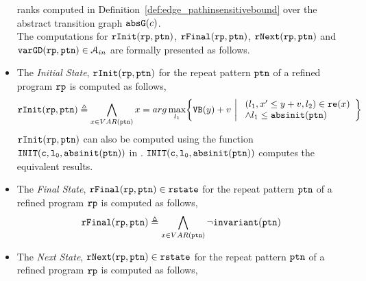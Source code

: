 \begin{itemize}
{ranks computed in Definition~\ref{def:edge_pathinsensitivebound} over the abstract transition graph $\mathtt{abs}{\mathtt{G}}(c)$.
}
\\
The computations for $\mathtt{rInit}(\mathtt{rp}, \mathtt{ptn})$,
$\mathtt{rFinal}(\mathtt{rp}, \mathtt{ptn})$, $\mathtt{rNext}(\mathtt{rp}, \mathtt{ptn})$ and $\mathtt{varGD}(\mathtt{rp}, \mathtt{ptn}) \in \mathcal{A}_{in}$
are formally presented as follows.
\item The \emph{Initial State}, $\mathtt{rInit}(\mathtt{rp}, \mathtt{ptn})$ for the repeat pattern $\mathtt{ptn}$ of a refined program $\mathtt{rp}$ is computed as follows,
\[
  \rfinit(\rprog, \rpattern) \triangleq 
  \bigwedge_{x \in VAR(\rpattern)}
  x
  = arg\max_{l_1}\left\{
    \varinvar(y) + v ~\middle\vert~ 
    \begin{array}{l} 
      (l_1, x' \leq y + v, l_2) \in \reset(x) 
      \\
    \land l_1 \leq \absinit(\rpattern)
  \end{array}
  \right\}
  \]
$\mathtt{rInit}(\mathtt{rp}, \mathtt{ptn})$ can also be computed using the function $\mathtt{INIT(c, l_0, \mathtt{abs}{\mathtt{init}}(\mathtt{ptn}))}$ in \cite{GulwaniJK09}. 
$\mathtt{INIT(c, l_0, \mathtt{abs}{\mathtt{init}}(\mathtt{ptn}))}$ computes the equivalent results.
%
\item  The {\emph{Final State}, $\mathtt{rFinal}(\mathtt{rp}, \mathtt{ptn}) \in \mathtt{rstate}$ for the repeat pattern $\mathtt{ptn}$ of a refined program $\mathtt{rp}$ is computed as follows, }
\[
  \mathtt{rFinal}(\mathtt{rp}, \mathtt{ptn}) \triangleq 
  \bigwedge_{x \in VAR(\mathtt{ptn})}
  \neg \mathtt{invariant}(\mathtt{ptn})
  \]
\item The \emph{Next State}, $\mathtt{rNext}(\mathtt{rp}, \mathtt{ptn}) \in \mathtt{rstate}$ for the repeat pattern $\mathtt{ptn}$ of a refined program $\mathtt{rp}$ is computed as follows,

\end{itemize}
